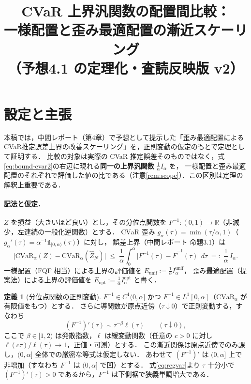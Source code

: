 \documentclass[a4paper,10pt]{jsarticle}
\title{CVaR 上界汎関数の配置間比較：\\一様配置と歪み最適配置の漸近スケーリング\\（予想4.1 の定理化・査読反映版 v2）}
\author{}
\date{}
\theoremstyle{definition}
\newtheorem{definition}{定義}[section]
\newcommand{\CVaR}{\mathrm{CVaR}}
\newcommand{\Finv}{F^{-1}}
\newcommand{\Fhinv}{\hat{F}^{-1}}
\newcommand{\R}{\mathbb{R}}
\begin{document}
\maketitle

\section{設定と主張}

本稿では，中間レポート（第4章）で予想として提示した「歪み最適配置によるCVaR推定誤差上界の改善スケーリング」を，正則変動の仮定のもとで定理として証明する．
比較の対象は実際の CVaR 推定誤差そのものではなく，式\eqref{eq:bound-cvar2}の右辺に現れる\textbf{同一の上界汎関数} $\frac1\alpha I_\alpha$ を，
一様配置と歪み最適配置のそれぞれで評価した値の比である（注意\ref{rem:scope}）．この区別は定理の解釈上重要である．

\paragraph{記法と仮定．}
$Z$ を損益（大きいほど良い）とし，その分位点関数を $\Finv\colon(0,1)\to\R$（非減少，左連続の一般化逆関数）とする．
$\CVaR$ 歪み $g_\alpha(\tau)=\min(\tau/\alpha,1)$（$g_\alpha'(\tau)=\alpha^{-1}\mathbb{1}_{[0,\alpha)}(\tau)$）に対し，
誤差上界（中間レポート 命題3.1）は
\begin{equation}
  \bigl|\CVaR_\alpha(Z)-\CVaR_\alpha(\hat Z_N)\bigr|
  \;\le\;\frac1\alpha\int_0^\alpha\bigl|\Finv(\tau)-\Fhinv(\tau)\bigr|\,d\tau
  \;=:\;\frac1\alpha\,I_\alpha .
  \label{eq:bound-cvar2}
\end{equation}
一様配置（FQF 相当）による上界の評価値を $E_{\mathrm{unif}}:=\frac1\alpha I_\alpha^{\mathrm{unif}}$，
歪み最適配置（提案法）による上界の評価値を $E_{\mathrm{opt}}:=\frac1\alpha I_\alpha^{\mathrm{opt}}$ と書く．

\begin{definition}[分位点関数の正則変動]
\label{def:regvar}
$\Finv\in C^1(0,\alpha]$ かつ $\Finv\in L^1[0,\alpha]$（$\CVaR_\alpha$ が有限値をもつ）とする．
さらに導関数が原点近傍（$\tau\downarrow0$）で正則変動する，すなわち
\begin{equation}
  (\Finv)'(\tau)\sim\tau^{-\beta}\ell(\tau)\qquad(\tau\downarrow0),
  \label{eq:regvar}
\end{equation}
ここで $\beta\in[1,2)$ は発散指数，$\ell$ は緩変動関数（任意の $c>0$ に対し $\ell(c\tau)/\ell(\tau)\to1$，正値・可測）とする．
この漸近関係は原点近傍でのみ課し，$(0,\alpha]$ 全体での厳密な等式は仮定しない．
あわせて $(\Finv)'$ は $(0,\alpha]$ 上で非増加（すなわち $\Finv$ は $(0,\alpha]$ で凹）とする．
式\eqref{eq:regvar}より $\tau$ 十分小で $(\Finv)'(\tau)>0$ であるから，$\Finv$ は下側裾で狭義単調増大である．
\end{definition}
\end{document}
